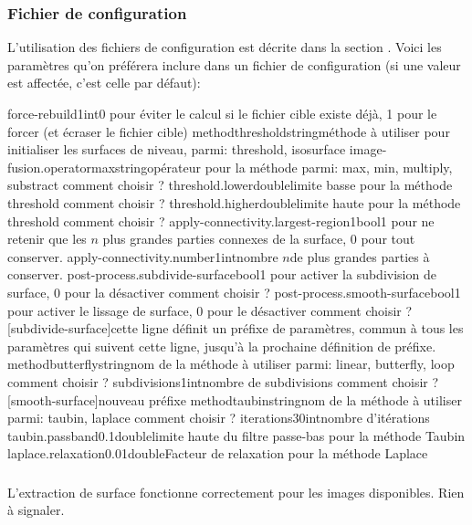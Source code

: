 	\subsubsection{Fichier de configuration}
	
L'utilisation des fichiers de configuration est décrite dans la section .
Voici les paramètres qu'on préférera inclure dans un fichier de configuration (si une valeur est affectée, c'est celle par défaut):

\configfile
{force-rebuild}{1}{int}{0 pour éviter le calcul si le fichier cible existe déjà, 1 pour le forcer (et écraser le fichier cible)}
{method}{threshold}{string}{méthode à utiliser pour initialiser les surfaces de niveau, parmi: threshold, isosurface}
{image-fusion.operator}{max}{string}{opérateur pour la méthode parmi: max, min, multiply, substract \tbv comment choisir ?}
{threshold.lower}{}{double}{limite basse pour la méthode threshold \tbv comment choisir ?}
{threshold.higher}{}{double}{limite haute pour la méthode threshold \tbv comment choisir ?}
{apply-connectivity.largest-region}{1}{bool}{1 pour ne retenir que les $n$ plus grandes parties connexes de la surface, 0 pour tout conserver.}
{apply-connectivity.number}{1}{int}{nombre $n$de plus grandes parties à conserver.}
{post-process.subdivide-surface}{}{bool}{1 pour activer la subdivision de surface, 0 pour la désactiver \tbv comment choisir ?}
{post-process.smooth-surface}{}{bool}{1 pour activer le lissage de surface, 0 pour le désactiver \tbv comment choisir ?}
{[subdivide-surface]}{cette ligne définit un préfixe de paramètres, commun à tous les paramètres qui suivent cette ligne, jusqu'à la prochaine définition de préfixe.}{}{}
{method}{butterfly}{string}{nom de la méthode à utiliser parmi: linear, butterfly, loop \tbv comment choisir ?}
{subdivisions}{1}{int}{nombre de subdivisions \tbv comment choisir ?}
{[smooth-surface]}{nouveau préfixe}{}{}
{method}{taubin}{string}{nom de la méthode à utiliser parmi: taubin, laplace \tbv comment choisir ?}
{iterations}{30}{int}{nombre d'itérations}
{taubin.passband}{0.1}{double}{limite haute du filtre passe-bas pour la méthode Taubin\tbv}
{laplace.relaxation}{0.01}{double}{Facteur de relaxation pour la méthode Laplace\tbv}
\stopfile

	\subsubsection{\etatg}

L'extraction de surface fonctionne correctement pour les images disponibles. Rien à signaler.


